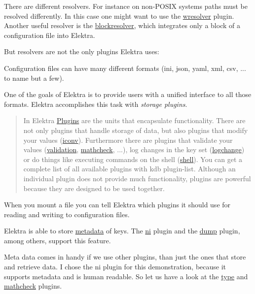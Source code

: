 There are different resolvers. For instance on non-\/\+P\+O\+S\+IX systems paths must be resolved differently. In this case one might want to use the \hyperlink{autotoc_md765_src_plugins_wresolver_README_md}{wresolver} plugin. Another useful resolver is the \hyperlink{autotoc_md64_src_plugins_blockresolver_README_md}{blockresolver}, which integrates only a block of a configuration file into Elektra.

But resolvers are not the only plugins Elektra uses\+:

Configuration files can have many different formats ({\ttfamily ini}, {\ttfamily json}, {\ttfamily yaml}, {\ttfamily xml}, {\ttfamily csv}, ... to name but a few).

One of the goals of Elektra is to provide users with a unified interface to all those formats. Elektra accomplishes this task with {\itshape storage plugins}.

\begin{quote}
In Elektra \hyperlink{doc_tutorials_plugins_md}{Plugins} are the units that encapsulate functionality. There are not only plugins that handle storage of data, but also plugins that modify your values (\hyperlink{autotoc_md279_src_plugins_iconv_README_md}{iconv}). Furthermore there are plugins that validate your values (\hyperlink{autotoc_md760_src_plugins_validation_README_md}{validation}, \hyperlink{autotoc_md368_src_plugins_mathcheck_README_md}{mathcheck}, ...), log changes in the key set (\hyperlink{autotoc_md357_src_plugins_logchange_README_md}{logchange}) or do things like executing commands on the shell (\hyperlink{autotoc_md597_src_plugins_shell_README_md}{shell}). You can get a complete list of all available plugins with {\ttfamily kdb plugin-\/list}. Although an individual plugin does not provide much functionality, plugins are powerful because they are designed to be used together. \end{quote}


When you mount a file you can tell Elektra which plugins it should use for reading and writing to configuration files.

Elektra is able to store \hyperlink{doc_help_elektra-metadata_md}{metadata} of keys. The \hyperlink{autotoc_md469_src_plugins_ni_README_md}{ni} plugin and the \hyperlink{autotoc_md191_src_plugins_dump_README_md}{dump} plugin, among others, support this feature.

Meta data comes in handy if we use other plugins, than just the ones that store and retrieve data. I chose the {\ttfamily ni} plugin for this demonstration, because it supports metadata and is human readable. So let us have a look at the \hyperlink{autotoc_md745_src_plugins_type_README_md}{type} and \hyperlink{autotoc_md368_src_plugins_mathcheck_README_md}{mathcheck} plugins.


